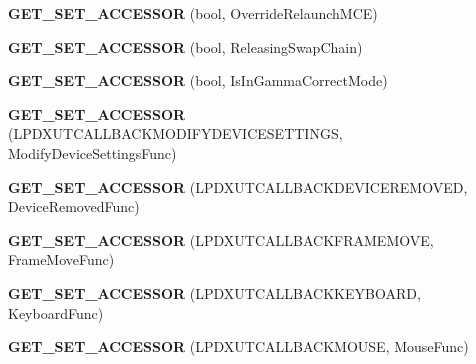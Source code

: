\begin{DoxyCompactItemize}
\item 
\hypertarget{class_d_x_u_t_state_a7a41aa4832e7af0cc22e3a5e2c91c1ae}{{\bfseries G\+E\+T\+\_\+\+S\+E\+T\+\_\+\+A\+C\+C\+E\+S\+S\+O\+R} (bool, Override\+Relaunch\+M\+C\+E)}\label{class_d_x_u_t_state_a7a41aa4832e7af0cc22e3a5e2c91c1ae}

\item 
\hypertarget{class_d_x_u_t_state_a599f48834fdb7f712aa743e7b0adace4}{{\bfseries G\+E\+T\+\_\+\+S\+E\+T\+\_\+\+A\+C\+C\+E\+S\+S\+O\+R} (bool, Releasing\+Swap\+Chain)}\label{class_d_x_u_t_state_a599f48834fdb7f712aa743e7b0adace4}

\item 
\hypertarget{class_d_x_u_t_state_a6785ca29396752f2100a1c609165e4c3}{{\bfseries G\+E\+T\+\_\+\+S\+E\+T\+\_\+\+A\+C\+C\+E\+S\+S\+O\+R} (bool, Is\+In\+Gamma\+Correct\+Mode)}\label{class_d_x_u_t_state_a6785ca29396752f2100a1c609165e4c3}

\item 
\hypertarget{class_d_x_u_t_state_ac0eb469750e15272e744bd9e558254f1}{{\bfseries G\+E\+T\+\_\+\+S\+E\+T\+\_\+\+A\+C\+C\+E\+S\+S\+O\+R} (L\+P\+D\+X\+U\+T\+C\+A\+L\+L\+B\+A\+C\+K\+M\+O\+D\+I\+F\+Y\+D\+E\+V\+I\+C\+E\+S\+E\+T\+T\+I\+N\+G\+S, Modify\+Device\+Settings\+Func)}\label{class_d_x_u_t_state_ac0eb469750e15272e744bd9e558254f1}

\item 
\hypertarget{class_d_x_u_t_state_a415449d753db02c7f235d19e1bd9f75c}{{\bfseries G\+E\+T\+\_\+\+S\+E\+T\+\_\+\+A\+C\+C\+E\+S\+S\+O\+R} (L\+P\+D\+X\+U\+T\+C\+A\+L\+L\+B\+A\+C\+K\+D\+E\+V\+I\+C\+E\+R\+E\+M\+O\+V\+E\+D, Device\+Removed\+Func)}\label{class_d_x_u_t_state_a415449d753db02c7f235d19e1bd9f75c}

\item 
\hypertarget{class_d_x_u_t_state_aca288de0e62695d031688b1808b1895a}{{\bfseries G\+E\+T\+\_\+\+S\+E\+T\+\_\+\+A\+C\+C\+E\+S\+S\+O\+R} (L\+P\+D\+X\+U\+T\+C\+A\+L\+L\+B\+A\+C\+K\+F\+R\+A\+M\+E\+M\+O\+V\+E, Frame\+Move\+Func)}\label{class_d_x_u_t_state_aca288de0e62695d031688b1808b1895a}

\item 
\hypertarget{class_d_x_u_t_state_a5c443318566115123606d590d7543e1f}{{\bfseries G\+E\+T\+\_\+\+S\+E\+T\+\_\+\+A\+C\+C\+E\+S\+S\+O\+R} (L\+P\+D\+X\+U\+T\+C\+A\+L\+L\+B\+A\+C\+K\+K\+E\+Y\+B\+O\+A\+R\+D, Keyboard\+Func)}\label{class_d_x_u_t_state_a5c443318566115123606d590d7543e1f}

\item 
\hypertarget{class_d_x_u_t_state_a2b21b8cf08ca2fbcc1e73e471726e6a4}{{\bfseries G\+E\+T\+\_\+\+S\+E\+T\+\_\+\+A\+C\+C\+E\+S\+S\+O\+R} (L\+P\+D\+X\+U\+T\+C\+A\+L\+L\+B\+A\+C\+K\+M\+O\+U\+S\+E, Mouse\+Func)}\label{class_d_x_u_t_state_a2b21b8cf08ca2fbcc1e73e471726e6a4}


\end{DoxyCompactItemize}
